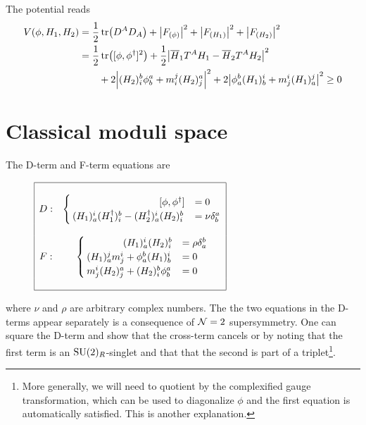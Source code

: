     The potential reads
    \begin{align}
        V(\phi,H_1,H_2) &= \frac{1}{2}\tr(D^AD_A)+\abs{F_{(\phi)}}^2+\abs{F_{(H_1)}}^2+\abs{F_{(H_2)}}^2\\
        &= \frac{1}{2}\tr([\phi,\phi^\dagger]^2)+\frac{1}{2}\abs{\overline{H}_1T^AH_1-\overline{H}_2T^AH_2}^2\\
        &\qquad+2\abs{(H_2)^b_i\phi^a_b+m^j_i(H_2)^a_j}^2+2\abs{\phi^b_a (H_1)^i_b+m^i_j(H_1)^j_a}^2 \geq 0
    \end{align}

\section{Classical moduli space}

    The D-term and F-term equations are 
    \begin{figure}[H]
        \centering
        $
        \begin{array}{|cc|}
            \hline
            & \\
            D:& \begin{cases}
                \hspace{3.1cm}[\phi,\phi^\dagger]  &= 0 \\
                (H_1)^i_a(H^\dagger_1)^b_i-(H^\dagger_2)^i_a(H_2)^b_i &= \nu\delta^a_b
            \end{cases}\\
        & \\
        F:&
        \begin{cases}
            \hspace{1.3cm}(H_1)^i_a(H_2)^b_i &= \rho\delta^b_a \\
            (H_1)^j_am^i_j+\phi^b_a(H_1)^i_b &= 0 \\
            m^i_j(H_2)^a_j+(H_2)^b_i\phi^a_b &= 0
        \end{cases}\\
        & \\ \hline
        \end{array}
        $
    \end{figure}
    where $\nu$ and $\rho$ are arbitrary complex numbers. The the two equations in the D-terms appear separately is a consequence of $\mathcal{N}=2$ supersymmetry. One can square the D-term and show that the cross-term cancels or by noting that the first term is an $\text{SU}(2)_R$-singlet and that that the second is part of a triplet\footnote{More generally, we will need to quotient by the complexified gauge transformation, which can be used to diagonalize $\phi$ and the first equation is automatically satisfied. This is another explanation.}.
    

